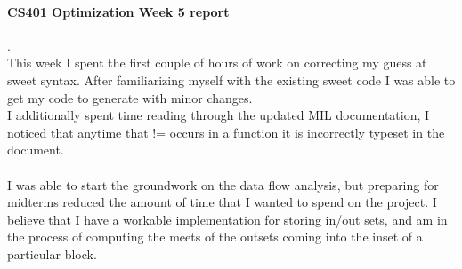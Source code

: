 \documentclass[14pt]{article}
\author{Joel Anna<annajoel@pdx.edu>}
\begin{document}
\paragraph{CS401 Optimization Week 5 report} 
.\\
This week I spent the first couple of hours of work on correcting my guess at sweet syntax. After familiarizing myself with the existing sweet code
I was able to get my code to generate with minor changes.\\
I additionally spent time reading through the updated MIL documentation, I noticed that anytime that != occurs in a function it is incorrectly typeset in the document.
\paragraph{}I was able to start the groundwork on the data flow analysis, but preparing for midterms reduced the amount of time that I wanted to spend on the project. I believe that I have a workable implementation for storing in/out sets, and am in the process of computing the meets of the outsets coming into the inset of a particular block.
\end{document}
